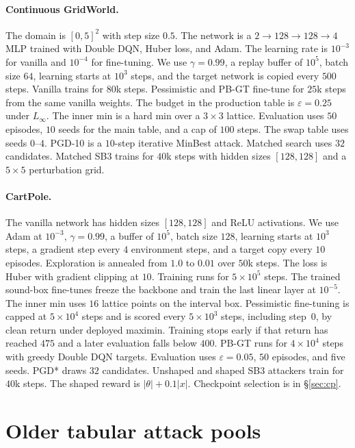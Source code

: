 \documentclass[10pt,twocolumn]{article}
\begin{document}
\paragraph{Continuous GridWorld.}
The domain is $[0,5]^2$ with step size $0.5$.
The network is a $2{\to}128{\to}128{\to}4$ MLP trained with Double DQN, Huber loss, and Adam.
The learning rate is $10^{-3}$ for vanilla and $10^{-4}$ for fine-tuning.
We use $\gamma{=}0.99$, a replay buffer of $10^5$, batch size $64$, learning starts at $10^3$ steps, and the target network is copied every $500$ steps.
Vanilla trains for $80$k steps.
Pessimistic and PB-GT fine-tune for $25$k steps from the same vanilla weights.
The budget in the production table is $\varepsilon{=}0.25$ under $L_\infty$.
The inner min is a hard min over a $3{\times}3$ lattice.
Evaluation uses $50$ episodes, $10$ seeds for the main table, and a cap of $100$ steps.
The swap table uses seeds $0$--$4$.
PGD-10 is a $10$-step iterative MinBest attack.
Matched search uses $32$ candidates.
Matched SB3 trains for $40$k steps with hidden sizes $[128,128]$ and a $5{\times}5$ perturbation grid.

\paragraph{CartPole.}
The vanilla network has hidden sizes $[128,128]$ and ReLU activations.
We use Adam at $10^{-3}$, $\gamma{=}0.99$, a buffer of $10^5$, batch size $128$, learning starts at $10^3$ steps, a gradient step every $4$ environment steps, and a target copy every $10$ episodes.
Exploration is annealed from $1.0$ to $0.01$ over $50$k steps.
The loss is Huber with gradient clipping at $10$.
Training runs for $5{\times}10^5$ steps.
The trained sound-box fine-tunes freeze the backbone and train the last linear layer at $10^{-5}$.
The inner min uses $16$ lattice points on the interval box.
Pessimistic fine-tuning is capped at $5{\times}10^4$ steps and is scored every $5{\times}10^3$ steps, including step~$0$, by clean return under deployed maximin.
Training stops early if that return has reached $475$ and a later evaluation falls below $400$.
PB-GT runs for $4{\times}10^4$ steps with greedy Double DQN targets.
Evaluation uses $\varepsilon{=}0.05$, $50$ episodes, and five seeds.
PGD* draws $32$ candidates.
Unshaped and shaped SB3 attackers train for $40$k steps.
The shaped reward is $|\theta|+0.1|x|$.
Checkpoint selection is in \S\ref{sec:cp}.

\section{Older tabular attack pools}
\label{app:worst910}
\end{document}

